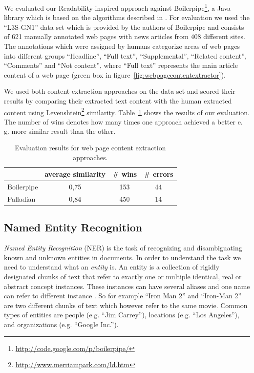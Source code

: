 \documentclass[a4paper,twoside]{book}      %
\begin{document}

We evaluated our Readability-inspired approach against Boilerpipe\footnote{\url{http://code.google.com/p/boilerpipe/}}, a Java library which is based on the algorithms described in \cite{BoilerplateDetectionShallowTextFeatures}. For evaluation we used the ``L3S-GN1'' data set which is provided by the authors of Boilerpipe and consists of 621 manually annotated web pages with news articles from 408 different sites. The annotations which were assigned by humans categorize areas of web pages into different groups ``Headline'', ``Full text'',  ``Supplemental'', ``Related content'', ``Comments'' and  ``Not content'', where ``Full text'' represents the main article content of a web page (green box in figure~\ref{fig:webpagecontentextractor}).

We used both content extraction approaches on the data set and scored their results by comparing their extracted text content with the human extracted content using Levenshtein\footnote{\url{http://www.merriampark.com/ld.htm}} similarity. Table~\ref{tab:pageContentExtractionResults} shows the results of our evaluation. The number of wins denotes how many times one approach achieved a better e. g. more similar result than the other.


\begin{table}[ht]
\centering
\begin{tabular}{|l|c|c|c|}
	\hline
	& average similarity & \# wins & \# errors \\ 
	\hline
	Boilerpipe & 0,75 & 153 & 44 \\ 
	\hline
	Palladian & 0,84 & 450 & 14 \\ 
	\hline
\end{tabular}
\caption{Evaluation results for web page content extraction approaches.}
\label{tab:pageContentExtractionResults}
\end{table}

\subsection{Named Entity Recognition}

{\it Named Entity Recognition} (NER) is the task of recognizing and disambiguating known and unknown entities in documents. In order to understand the task we need to understand what an {\it entity} is. An entity is a collection of rigidly designated chunks of text that refer to exactly one or multiple identical, real or abstract concept instances. These instances can have several aliases and one name can refer to different instance \cite{webknoxblogne}. So for example ``Iron Man 2'' and ``Iron-Man 2'' are two different chunks of text which however refer to the same movie. Common types of entities are people (e.g. ``Jim Carrey''), locations (e.g. ``Los Angeles''), and organizations (e.g. ``Google Inc.'').
\end{document}

